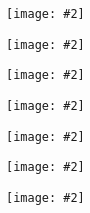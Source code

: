 \documentclass[landscape,a0b,final]{a0poster}
\newenvironment{poster}{
  \begin{center}
  \begin{minipage}[c]{0.98\textwidth}
}{
  \end{minipage} 
  \end{center}
}
\newcommand{\myfig}[3][0]{
\begin{center}
  \vspace{1.5cm}
  \texttt{[image: \#2]}
  \nobreak\medskip
\end{center}}
\newcommand{\mycaption}[1]{
  \vspace{0.5cm}
  \begin{quote}
    {{\sc Fig.} \arabic{figure}: #1}
  \end{quote}
  \vspace{1cm}
  \stepcounter{figure}
}
\begin{document}
\begin{poster}
\begin{multicols}{3}
\begin{multicols}{2}
  \end{multicols}

  \vspace{-4.0cm}
  \setlength{\columnsep}{0pt}
  \setlength{\columnseprule}{0pt}
  \hspace{-2cm}
  \begin{multicols}{2}
  \begin{center}
  \myfig{c_overlap_350_4.ps}{1.0}
  \end{center}
  \begin{center}
  \myfig{c_approx_ionization.ps}{1.0}
  \end{center}
  \end{multicols}

  \vspace{-4.0cm}
  \setlength{\columnsep}{0pt}
  \setlength{\columnseprule}{0pt}
  \hspace{-2cm}
  \begin{multicols}{2}
  \begin{center}
  \myfig{c_spectrum_350_2_36_2_highin.ps}{1.0}
  \end{center}

  \begin{center}
  \myfig{c_spectrum_350_2_36_2_lowin.ps}{1.0}
  \end{center}
  \end{multicols}
  \vspace{-3.5cm}
  \setlength{\columnsep}{0pt}
  \setlength{\columnseprule}{0pt}
  \hspace{-2cm}
  \begin{multicols}{2}
  \begin{center}
  \myfig{c_spectrum_375_2_36_2_highin.ps}{1.0}
  \end{center}

  \begin{center}
  \myfig{c_spectrum_375_2_36_2_lowin.ps}{1.0}
  \end{center}
  \end{multicols}
  \vspace{-2.5cm}
  \hrulefill

  \vspace{-2.0cm}
  \setlength{\columnsep}{0pt}
  \setlength{\columnseprule}{0pt}
  \hspace{-2cm}
  \begin{multicols}{2}
  \begin{center}
  \myfig{c_spectrum_350_3_34_3_highin.ps}{1.0}
  \end{center}


\end{multicols}
\end{multicols}
\end{poster}
\end{document}
